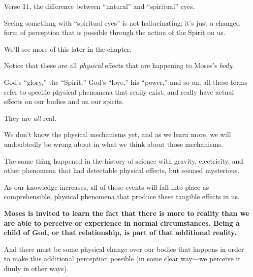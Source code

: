 \begin{compactitem}
\begin{compactitem}
					\item Verse 11, the difference between ``natural'' and ``spiritual'' eyes.
						\begin{compactitem}
							\item {}
							\item Seeing sometihng with ``spiritual eyes'' is not hallucinating; it's just a changed form of perception that is possible through the action of the Spirit on us.
							\item We'll see more of this later in the chapter.
						\end{compactitem}
					\item Notice that these are all \textit{physical} effects that are happening to Moses's \textit{body}.
						\begin{compactitem}
							\item God's ``glory,'' the ``Spirit,'' God's ``love,'' his ``power,'' and so on, all these terms refer to specific physical phenomena that really exist, and really have actual effects on our bodies and on our spirits.
							\item They are \textit{all} real.
							\item We don't know the physical mechanisms yet, and as we learn more, we will undoubtedly be wrong about in what we think about those mechanisms.
							\item The same thing happened in the history of science with gravity, electricity, and other phenomena that had detectable physical effects, but seemed mysterious.
							\item As our knowledge increases, all of these events will fall into place as comprehensible, physical phenomena that produce these tangible effects in us.
						\end{compactitem}
					\item \textbf{Moses is invited to learn the fact that there is more to reality than we are able to perceive or experience in normal circumstances. Being a child of God, or that relationship, is part of that additional reality.}
						\begin{compactitem}
							\item And there must be some physical change over our bodies that happens in order to make this additional perception possible (in some clear way---we perceive it dimly in other ways).
						\end{compactitem}
				\end{compactitem}
				

\end{compactitem}
